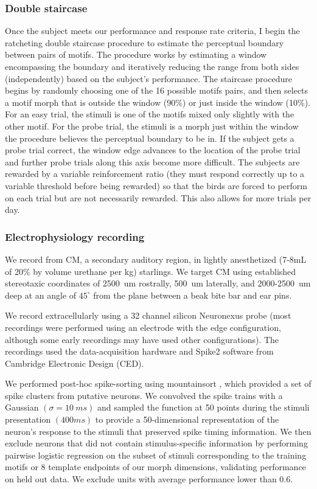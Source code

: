 \subsubsection{Double staircase}
Once the subject meets our performance and response rate criteria, I begin the ratcheting double staircase procedure to estimate the perceptual boundary between pairs of motifs. The procedure works by estimating a window encompassing the boundary and iteratively reducing the range from both sides (independently) based on the subject's performance. The staircase procedure begins by randomly choosing one of the 16 possible motifs pairs, and then selects a motif morph that is outside the window (90\%) or just inside the window (10\%). For an easy trial, the stimuli is one of the motifs mixed only slightly with the other motif. For the probe trial, the stimuli is a morph just within the window the procedure believes the perceptual boundary to be in. If the subject gets a probe trial correct, the window edge advances to the location of the probe trial and further probe trials along this axis become more difficult. The subjects are rewarded by a variable reinforcement ratio (they must respond correctly up to a variable threshold before being rewarded) so that the birds are forced to perform on each trial but are not necessarily rewarded. This also allows for more trials per day.

\subsubsection{Electrophysiology recording}

We record from \ac{CM}, a secondary auditory region, in lightly anesthetized (7-8mL of 20\% by volume urethane per kg) starlings. We target \ac{CM} using established stereotaxic coordinates of \SI{2500}{um} rostrally, \SI{500}{um} laterally, and 2000-\SI{2500}{um} deep at an angle of $45^\circ$ from the plane between a beak bite bar and ear pins. 

We record extracellularly using a 32 channel silicon Neuronexus probe (most recordings were performed using an electrode with the edge configuration, although some early recordings may have used other configurations). The recordings used the data-acquisition hardware and Spike2 software from Cambridge Electronic Design (CED).

We performed post-hoc spike-sorting using mountainsort \cite{mountainsort}, which provided a set of spike clusters from putative neurons. We convolved the spike trains with a Gaussian $(\sigma=\SI{10}{ms})$ and sampled the function at 50 points during the stimuli presentation $(400 ms)$ to provide a 50-dimensional representation of the neuron's response to the stimuli that preserved spike timing information. We then exclude neurons that did not contain stimulus-specific information by performing pairwise logistic regression on the subset of stimuli corresponding to the training motifs or 8 template endpoints of our morph dimensions, validating performance on held out data. We exclude units with average performance lower than 0.6.

